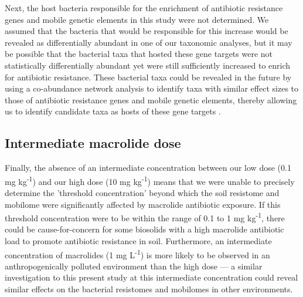 Next, the host bacteria responsible for the enrichment of antibiotic resistance genes and mobile genetic elements in this study were not determined.
We assumed that the bacteria that would be responsible for this increase would be revealed as differentially abundant in one of our taxonomic analyses, but it may be possible that the bacterial taxa that hosted these gene targets were not statistically differentially abundant yet were still sufficiently increased to enrich for antibiotic resistance.
These bacterial taxa could be revealed in the future by using a co-abundance network analysis to identify taxa with similar effect sizes to those of antibiotic resistance genes and mobile genetic elements, thereby allowing us to identify candidate taxa as hosts of these gene targets \parencite{Forsberg.2014}.

\subsection{Intermediate macrolide dose}

Finally, the absence of an intermediate concentration between our low dose (0.1 mg kg\textsuperscript{-1}) and our high dose (10 mg kg\textsuperscript{-1}) means that we were unable to precisely determine the 'threshold concentration' beyond which the soil resistome and mobilome were significantly affected by macrolide antibiotic exposure.
If this threshold concentration were to be within the range of 0.1 to 1 mg kg\textsuperscript{-1}, there could be cause-for-concern for some biosolids with a high macrolide antibiotic load to promote antibiotic resistance in soil.
Furthermore, an intermediate concentration of macrolides (1 mg L\textsuperscript{-1}) is more likely to be observed in an anthropogenically polluted environment than the high dose --- a similar investigation to this present study at this intermediate concentration could reveal similar effects on the bacterial resistomes and mobilomes in other environments.
